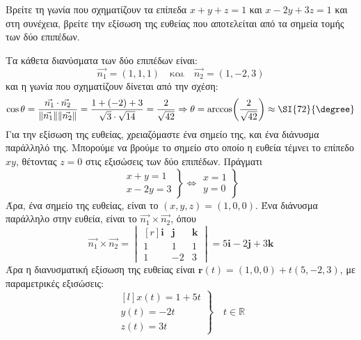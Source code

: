 \begin{example}
  Βρείτε τη γωνία που σχηματίζουν τα επίπεδα $ x+y+z=1 $ και $ x-2y+3z=1 $ και 
  στη συνέχεια, βρείτε την εξίσωση της ευθείας που αποτελείται από τα σημεία τομής 
  των δύο επιπέδων.
\end{example}
\begin{solution}
  Τα κάθετα διανύσματα των δύο επιπέδων είναι:
  \[
    \vec{n_{1}} = (1,1,1) \quad \text{και} \quad \vec{n_{2}} = (1,-2,3) 
  \]
  και η γωνία που σχηματίζουν δίνεται από την σχέση:
  \[
    \cos{\theta} = \frac{\vec{n_{1}} \cdot \vec{n_{2}}}{\norm{\vec{n_{1}}}
    \norm{\vec{n_{2}}}} = \frac{1+(-2)+3}{\sqrt{3}\cdot \sqrt{14}} =
    \frac{2}{\sqrt{42}} \Rightarrow \theta = \arccos(\frac{2}{\sqrt{42}}) \approx 
    \SI{72}{\degree} 
  \] 
  Για την εξίσωση της ευθείας, χρειαζόμαστε ένα σημείο της, και ένα διάνυσμα 
  παράλληλό της. Μπορούμε να βρούμε το σημείο στο οποίο η ευθεία τέμνει το επίπεδο 
  $ xy $, θέτοντας $ z=0 $ στις εξισώσεις των δύο επιπέδων. Πράγματι 
  \[
    \left.
      \begin{matrix}
        x+y=1 \\
        x-2y=3
      \end{matrix} 
    \right\} \Leftrightarrow 
    \left.
      \begin{matrix}
        x=1 \\
        y=0
      \end{matrix} 
    \right\} 
  \] 
  Άρα, ένα σημείο της ευθείας, είναι το $ (x,y,z) = (1,0,0) $.
  Ένα διάνυσμα παράλληλο στην ευθεία, είναι το $ \vec{n_{1}} \times \vec{n_{2}} $, 
  όπου
  \[
    \vec{n_{1}} \times \vec{n_{2}} = 
    \begin{vmatrix*}[r]
      \mathbf{i} & \mathbf{j} & \mathbf{k} \\
      1 & 1 & 1 \\
      1 & -2 & 3
    \end{vmatrix*} = 5 \mathbf{i}- 2 \mathbf{j}+ 3 \mathbf{k} 
  \] 
  Άρα η διανυσματική εξίσωση της ευθείας είναι 
  $ \mathbf{r}(t) = (1,0,0) + t(5,-2,3) $, με παραμετρικές εξισώσεις:
  \[
    \left.
      \begin{matrix*}[l]
        x(t) = 1+5t \\
        y(t) = -2t \\
        z(t) = 3t
      \end{matrix*} 
    \right\} \quad t \in \mathbb{R}
  \]
\end{solution}




